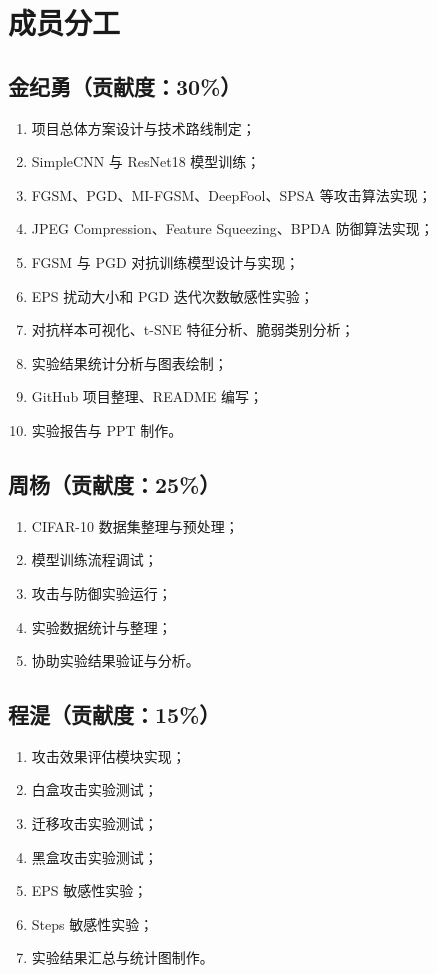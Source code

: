 \documentclass[UTF8,a4paper,12pt]{ctexart}
\begin{document}
\section{成员分工}

\subsection*{金纪勇（贡献度：30\%）}
\begin{enumerate}
    \item 项目总体方案设计与技术路线制定；
    \item SimpleCNN 与 ResNet18 模型训练；
    \item FGSM、PGD、MI-FGSM、DeepFool、SPSA 等攻击算法实现；
    \item JPEG Compression、Feature Squeezing、BPDA 防御算法实现；
    \item FGSM 与 PGD 对抗训练模型设计与实现；
    \item EPS 扰动大小和 PGD 迭代次数敏感性实验；
    \item 对抗样本可视化、t-SNE 特征分析、脆弱类别分析；
    \item 实验结果统计分析与图表绘制；
    \item GitHub 项目整理、README 编写；
    \item 实验报告与 PPT 制作。
\end{enumerate}

\subsection*{周杨（贡献度：25\%）}
\begin{enumerate}
    \item CIFAR-10 数据集整理与预处理；
    \item 模型训练流程调试；
    \item 攻击与防御实验运行；
    \item 实验数据统计与整理；
    \item 协助实验结果验证与分析。
\end{enumerate}

\subsection*{程湜（贡献度：15\%）}
\begin{enumerate}
    \item 攻击效果评估模块实现；
    \item 白盒攻击实验测试；
    \item 迁移攻击实验测试；
    \item 黑盒攻击实验测试；
    \item EPS 敏感性实验；
    \item Steps 敏感性实验；
    \item 实验结果汇总与统计图制作。
\end{enumerate}
\end{document}
